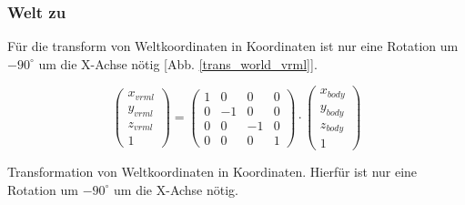 \subsubsection{Welt zu \vrml}
Für die \gls{transform} von Weltkoordinaten in \vrml Koordinaten ist nur eine Rotation um $-90^\circ$ um die X-Achse nötig [Abb. \ref{trans_world_vrml}].
\begin{ownequation}[H]
\begin{equation}
\begin{pmatrix}
x_{vrml}\\y_{vrml}\\z_{vrml}\\1
\end{pmatrix}
=
\begin{pmatrix}
1 & 0 & 0& 0\\
0 & -1 & 0& 0\\
0 & 0 & -1& 0\\
0 & 0 & 0 & 1
\end{pmatrix}
\cdot
\begin{pmatrix}
x_{body}\\y_{body}\\z_{body}\\1
\end{pmatrix}
\end{equation}
\caption[\gls{transform} von Weltkoordinaten in \vrml Koordinaten]{Transformation von Weltkoordinaten in \vrml Koordinaten. Hierfür ist nur eine Rotation um $-90^\circ$ um die X-Achse nötig.}
\label{trans_world_vrml}
\end{ownequation}